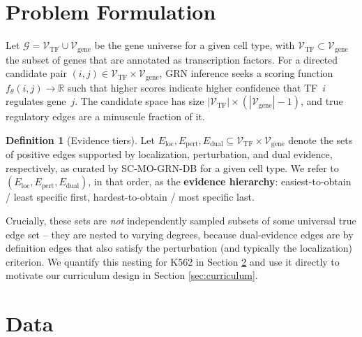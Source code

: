 \documentclass{article}
\theoremstyle{plain}
\theoremstyle{definition}
\newtheorem{definition}[proposition]{Definition}
\begin{document}
\section{Problem Formulation}
\label{sec:formulation}

Let $\mathcal{G} = \mathcal{V}_{\text{TF}} \cup \mathcal{V}_{\text{gene}}$ be the
gene universe for a given cell type, with $\mathcal{V}_{\text{TF}} \subset
\mathcal{V}_{\text{gene}}$ the subset of genes that are annotated as
transcription factors. For a directed candidate pair $(i, j) \in
\mathcal{V}_{\text{TF}} \times \mathcal{V}_{\text{gene}}$, GRN inference seeks a
scoring function $f_\theta(i,j) \to \mathbb{R}$ such that higher scores indicate
higher confidence that TF~$i$ regulates gene~$j$. The candidate space has size
$|\mathcal{V}_{\text{TF}}| \times (|\mathcal{V}_{\text{gene}}| - 1)$, and true
regulatory edges are a minuscule fraction of it.

\begin{definition}[Evidence tiers]
Let $E_{\text{loc}}, E_{\text{pert}}, E_{\text{dual}} \subseteq
\mathcal{V}_{\text{TF}} \times \mathcal{V}_{\text{gene}}$ denote the sets of
positive edges supported by localization, perturbation, and dual evidence,
respectively, as curated by SC-MO-GRN-DB for a given cell type. We refer to
$(E_{\text{loc}}, E_{\text{pert}}, E_{\text{dual}})$, in that order, as the
\textbf{evidence hierarchy}: easiest-to-obtain / least specific first,
hardest-to-obtain / most specific last.
\end{definition}

Crucially, these sets are \emph{not} independently sampled subsets of some
universal true edge set -- they are nested to varying degrees, because
dual-evidence edges are by definition edges that also satisfy the perturbation
(and typically the localization) criterion. We quantify this nesting for K562 in
Section \ref{sec:data} and use it directly to motivate our curriculum design in
Section \ref{sec:curriculum}.

\section{Data}
\label{sec:data}
\end{document}

